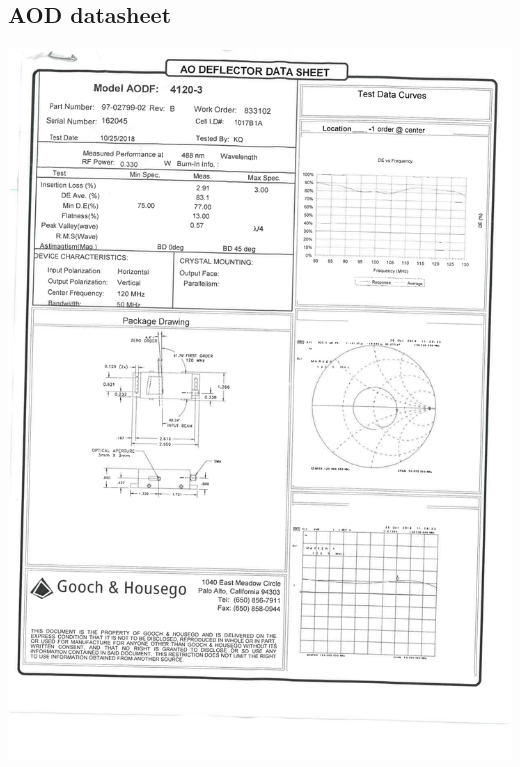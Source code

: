 \documentclass[english, a4paper, 12pt, twoside]{book}
\numberwithin{equation}{section} %
\begin{document}
\begin{appendices}
\chapter{AOD datasheet}
\label{sec:aoddata}
\includegraphics[scale=0.7]{SKM_C36819012815280}


\end{appendices}
\end{document}
